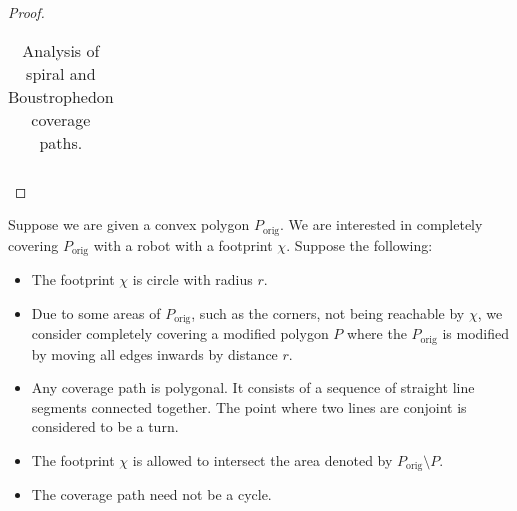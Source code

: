 \documentclass[../main.tex]{subfiles}
\begin{document}
\begin{proof}
\begin{table*}
\begin{tabular}{@{} l ccc@{}}
		\bottomrule

	\end{tabular}
	\caption{Analysis of spiral and Boustrophedon coverage paths.}
	\label{table:path_comprasions}
\end{table*}

\end{proof}



Suppose we are given a convex polygon $P_{\operatorname{orig}}$. We are interested in completely covering $P_{\operatorname{orig}}$ with a robot with a footprint $\chi$.
Suppose the following:
\begin{itemize}
	\item The footprint $\chi$ is circle with radius $r$.
	\item Due to some areas of $P_{\operatorname{orig}}$, such as the corners, not being reachable by $\chi$, we consider completely covering a modified polygon $P$ where the $P_{\operatorname{orig}}$ is modified by moving all edges inwards by distance $r$.
	\item Any coverage path is polygonal. It consists of a sequence of straight line segments connected together. The point where two lines are conjoint  is considered to be a turn.
	\item The footprint $\chi$ is allowed to intersect the area denoted by $P_{\operatorname{orig}}\setminus P$.
	\item The coverage path need not be a cycle.
\end{itemize}

\begin{lemma}

\end{lemma}
\end{document}
